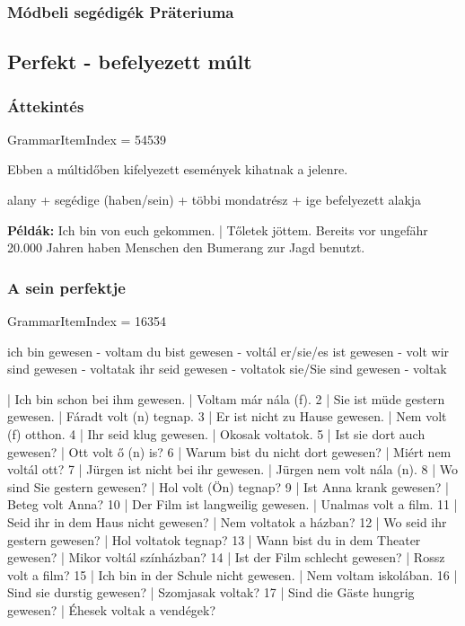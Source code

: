 \documentclass{article}
\newenvironment{desc}{\verbatim}{\endverbatim}
\newenvironment{exmp}{\verbatim}{\endverbatim}
\begin{document}
\subsubsection{Módbeli segédigék Präteriuma}

\subsection{Perfekt - befelyezett múlt}

\subsubsection{Áttekintés}

GrammarItemIndex = 54539

\begin{desc}
Ebben a múltidőben kifelyezett események kihatnak a jelenre.
\begin{center}
alany + segédige (haben/sein) + többi mondatrész + ige befelyezett alakja
\end{center}

\textbf{Példák:} Ich bin von euch gekommen. | Tőletek jöttem.
Bereits vor ungefähr 20.000 Jahren haben Menschen den Bumerang zur Jagd benutzt.
\end{desc}

\subsubsection{A sein perfektje}

GrammarItemIndex = 16354

\begin{desc}
ich bin gewesen - voltam
du bist gewesen - voltál
er/sie/es ist gewesen - volt
wir sind gewesen - voltatak
ihr seid gewesen - voltatok
sie/Sie sind gewesen - voltak
\end{desc}

\begin{exmp}
1 | Ich bin schon bei ihm gewesen. | Voltam már nála (f).
2 | Sie ist müde gestern gewesen. | Fáradt volt (n) tegnap.
3 | Er ist nicht zu Hause gewesen. | Nem volt (f) otthon.
4 | Ihr seid klug gewesen. | Okosak voltatok.
5 | Ist sie dort auch gewesen? | Ott volt ő (n) is?
6 | Warum bist du nicht dort gewesen? | Miért nem voltál ott?
7 | Jürgen ist nicht bei ihr gewesen. | Jürgen nem volt nála (n).
8 | Wo sind Sie gestern gewesen? | Hol volt (Ön) tegnap?
9 | Ist Anna krank gewesen? | Beteg volt Anna?
10 | Der Film ist langweilig gewesen. | Unalmas volt a film.
11 | Seid ihr in dem Haus nicht gewesen? | Nem voltatok a házban?
12 | Wo seid ihr gestern gewesen? | Hol voltatok tegnap?
13 | Wann bist du in dem Theater gewesen? | Mikor voltál színházban?
14 | Ist der Film schlecht gewesen? | Rossz volt a film?
15 | Ich bin in der Schule nicht gewesen. | Nem voltam iskolában.
16 | Sind sie durstig gewesen? | Szomjasak voltak?
17 | Sind die Gäste hungrig gewesen? | Éhesek voltak a vendégek?
\end{exmp}
\end{document}
